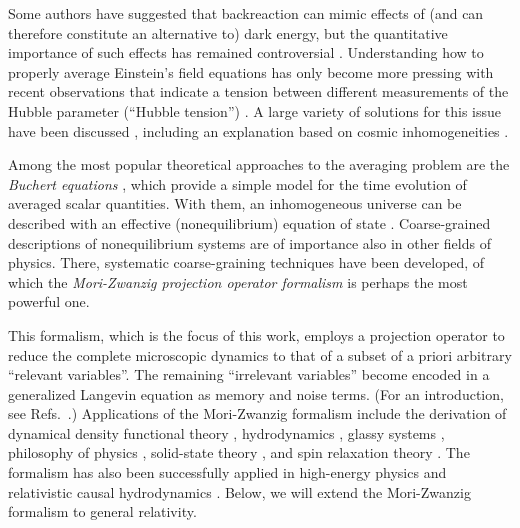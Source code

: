 \documentclass[aps,prl,twocolumn,10pt,superscriptaddress,nofootinbib,balancelastpage]{revtex4-1}
\newcommand{\ZT}[1]{\textquotedblleft#1\textquotedblright}%
\begin{document}
Some authors have suggested that backreaction can mimic effects of (and can therefore constitute an alternative to) dark energy, but the quantitative importance of such effects has remained controversial \cite{Kolb2011,ClarksonELU2011,BuchertEtAl2015,Buchert2005}. Understanding how to properly average Einstein's field equations has only become more pressing with recent observations that indicate a tension between different measurements of the Hubble parameter (\ZT{Hubble tension}) \cite{PoulinSKK2019,JedamzikP2020,BerghausK2020,Freedman2017,Riess2020}. A large variety of solutions for this issue have been discussed \cite{DiValentinoEtAl2021}, including an explanation based on cosmic inhomogeneities \cite{HeinesenB2020,Bolejko2018,MacphersonLP2018}.

Among the most popular theoretical approaches to the averaging problem are the \textit{Buchert equations} \cite{Buchert2000,Buchert2001,BuchertMR2020}, which provide a simple model for the time evolution of averaged scalar quantities. With them, an inhomogeneous universe can be described with an effective (nonequilibrium) equation of state \cite{Buchert2005}. Coarse-grained descriptions of nonequilibrium systems are of importance also in other fields of physics. There, systematic coarse-graining techniques have been developed, of which the \textit{Mori-Zwanzig projection operator formalism} \cite{Mori1965,Zwanzig1960,Nakajima1958,teVrugtW2019,MeyerVS2017,MeyerVS2019} is perhaps the most powerful one. 

This formalism, which is the focus of this work, employs a projection operator to reduce the complete microscopic dynamics to that of a subset of a priori arbitrary  \ZT{relevant variables}. The remaining \ZT{irrelevant variables} become encoded in a generalized Langevin equation as memory and noise terms. (For an introduction, see Refs.\ \cite{Grabert1982,teVrugtW2019d,KlipensteinTJSvdV2021,RauM1996,Schilling2021}.) Applications of the Mori-Zwanzig formalism include the derivation of dynamical density functional theory \cite{teVrugtLW2020,Yoshimori2005,EspanolL2009,WittkowskiLB2012,WittkowskiLB2013,WittkowskitVJLB2021}, hydrodynamics \cite{WittkowskitVJLB2021,CamargodlTDZEDBC2018}, glassy systems \cite{Das2004}, philosophy of physics \cite{teVrugt2020,Robertson2018,Wallace2015}, solid-state theory \cite{Fulde1995,KakehashiF2004}, and spin relaxation theory \cite{teVrugtW2019,KivelsonO1974,Bouchard2007}. The formalism has also been successfully applied in high-energy physics and relativistic causal hydrodynamics \cite{HuangKKR2011,KoideK2008,KoideNK2009,Koide2007,KoideM2000,KoideMT1999}. Below, we will extend the Mori-Zwanzig formalism to general relativity. 
 
\end{document}
